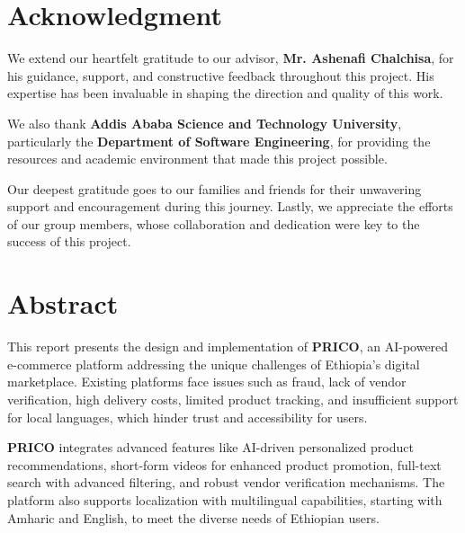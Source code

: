 \documentclass[12pt]{report}
\begin{document}

\chapter*{Acknowledgment}

We extend our heartfelt gratitude to our advisor, \textbf{Mr. Ashenafi Chalchisa}, for
his guidance, support, and constructive feedback throughout this project. His
expertise has been invaluable in shaping the direction and quality of this work.

We also thank \textbf{Addis Ababa Science and Technology University}, particularly the
\textbf{Department of Software Engineering}, for providing the resources and academic
environment that made this project possible.

Our deepest gratitude goes to our families and friends for their unwavering
support and encouragement during this journey. Lastly, we appreciate the
efforts of our group members, whose collaboration and dedication were key to the success of this project.

\newpage

\tableofcontents

\listoffigures
{}

\listoftables
{}


\chapter*{Abstract}

This report presents the design and implementation of \textbf{PRICO}, an AI-powered
e-commerce platform addressing the unique challenges of Ethiopia's digital
marketplace. Existing platforms face issues such as fraud, lack of vendor
verification, high delivery costs, limited product tracking, and
insufficient support for local languages, which hinder trust and
accessibility for users.

\textbf{PRICO} integrates advanced features like AI-driven personalized product
recommendations, short-form videos for enhanced product promotion,
full-text search with advanced filtering, and robust vendor verification
mechanisms. The platform also supports localization with multilingual
capabilities, starting with Amharic and English, to meet the diverse needs
of Ethiopian users.
\end{document}
